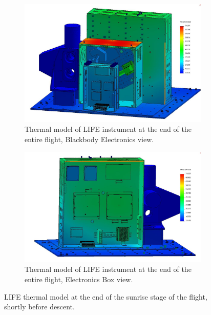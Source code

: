 \begin{figure}
    \centering
    \begin{subfigure}[h]{0.8\textwidth}
        \centering
        \includegraphics[width=\textwidth]{chap4_images/sunrise_images/Test_11_BBEbox.JPG}
        \caption{Thermal model of LIFE instrument at the end of the entire flight, Blackbody Electronics view.}
        \label{fig:sunrise_model_ebox}
    \end{subfigure}
    \begin{subfigure}[h]{0.9\textwidth}
        \centering
        \includegraphics[width=\textwidth]{chap4_images/sunrise_images/Test_11_Ebox.JPG}
        \caption{Thermal model of LIFE instrument at the end of the entire flight, Electronics Box view.}
        \label{sunrise_model_ebox}
    \end{subfigure}
    \caption{LIFE thermal model at the end of the sunrise stage of the flight, shortly before descent.}
    \label{sunrise_model}
\end{figure}

